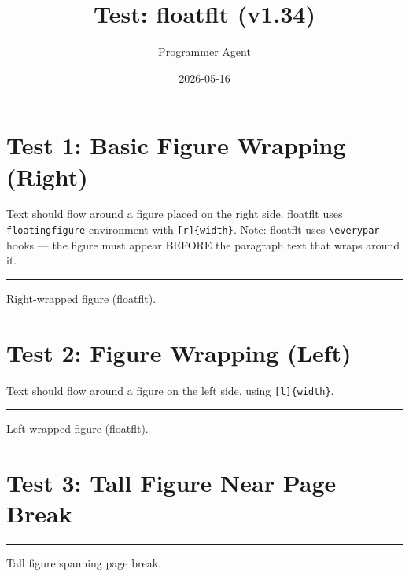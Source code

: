 \documentclass[a4paper,11pt]{article}
\title{Test: floatflt (v1.34)}
\author{Programmer Agent}
\date{2026-05-16}
\begin{document}
\maketitle

\section*{Test 1: Basic Figure Wrapping (Right)}
Text should flow around a figure placed on the right side.
floatflt uses \texttt{floatingfigure} environment with \verb|[r]{width}|.
Note: floatflt uses \texttt{\textbackslash everypar} hooks — the figure must
appear BEFORE the paragraph text that wraps around it.

\begin{floatingfigure}[r]{0.35\textwidth}
  \centering
  \rule{0.3\textwidth}{4cm}
  \caption{Right-wrapped figure (floatflt).}
  \label{fig:right}
\end{floatingfigure}

\lipsum[1-2]

\section*{Test 2: Figure Wrapping (Left)}
Text should flow around a figure on the left side, using \verb|[l]{width}|.

\begin{floatingfigure}[l]{0.35\textwidth}
  \centering
  \rule{0.3\textwidth}{4cm}
  \caption{Left-wrapped figure (floatflt).}
  \label{fig:left}
\end{floatingfigure}

\lipsum[3-4]

\section*{Test 3: Tall Figure Near Page Break}

\begin{floatingfigure}[r]{0.35\textwidth}
  \centering
  \rule{0.3\textwidth}{8cm}
  \caption{Tall figure spanning page break.}
  \label{fig:pagebreak}
\end{floatingfigure}
\end{document}
